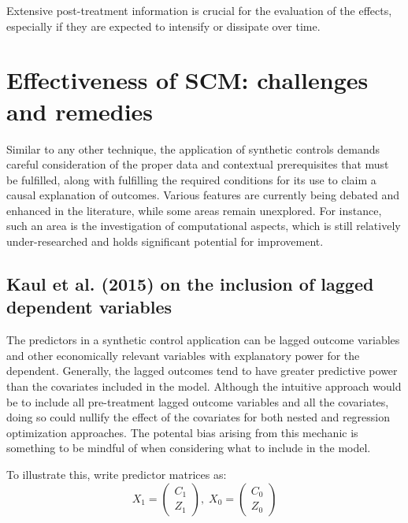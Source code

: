 \documentclass[12pt,a4paper,draft]{article}
\begin{document}
Extensive post-treatment information is crucial for the evaluation of the effects, 
especially if they are expected to intensify or dissipate over time.










\section{Effectiveness of SCM: challenges and remedies}

Similar to any other technique, the application of synthetic controls demands 
careful consideration of the proper data and contextual prerequisites that must be 
fulfilled, along with fulfilling the required conditions for its use to claim a 
causal explanation of outcomes. Various features are currently being debated and 
enhanced in the literature, while some areas remain unexplored. 
For instance, such an area is the investigation of computational aspects, 
which is still relatively under-researched and holds significant potential for 
improvement.





\subsection{Kaul et al. (2015) on the inclusion of lagged dependent variables}

The predictors in a synthetic control application can be lagged outcome variables and other 
economically relevant variables with explanatory power for the dependent. Generally, 
the lagged outcomes tend to have greater predictive power than the covariates included 
in the model. 
Although the intuitive approach would be to include all pre-treatment lagged outcome 
variables and all the covariates, doing so could nullify the effect of the covariates 
for both nested and regression optimization approaches. The potental bias arising 
from this mechanic is something to be mindful of when considering what to include 
in the model.

To illustrate this, write predictor matrices as:
\begin{equation}
    X_1 = \left( \begin{matrix} C_1 \\ Z_1 \end{matrix} \right), \;
    X_0 = \left( \begin{matrix} C_0 \\ Z_0 \end{matrix} \right)
\end{equation}
\end{document}
